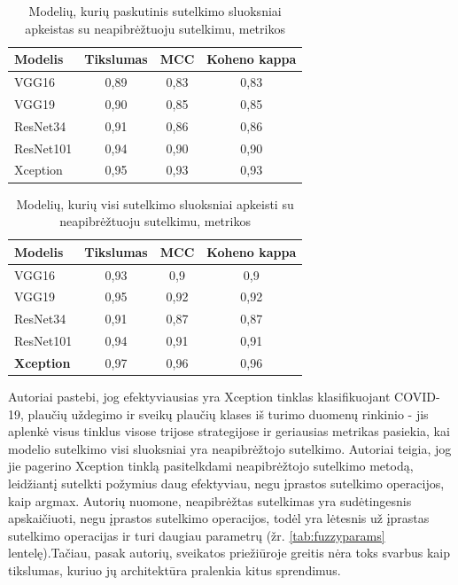 \documentclass[fleqn]{VUMIFKompMagistrinis}
\begin{document}
\begin{table}[H]\footnotesize
  \centering
\caption{Modelių, kurių paskutinis sutelkimo sluoksniai apkeistas su neapibrėžtuoju sutelkimu, metrikos \cite{HASAN2023}}
\begin{tabular}{|l|c|c|c|}
\hline
Modelis      & Tikslumas & MCC   & Koheno kappa \\ \hline
VGG16      & 0,89  & 0,83 &  0,83           \\
VGG19      & 0,90  & 0,85 &  0,85           \\
ResNet34   & 0,91  & 0,86 & 0,86           \\
ResNet101  & 0,94  & 0,90 & 0,90           \\
Xception   & 0,95  & 0,93 & 0,93         \\ \hline
  \end{tabular}
  \label{tab:fuzzyiverciai2}
\end{table}

\begin{table}[H]\footnotesize
  \centering
\caption{Modelių, kurių visi sutelkimo sluoksniai apkeisti su neapibrėžtuoju sutelkimu, metrikos \cite{HASAN2023}}
\begin{tabular}{|l|c|c|c|}
\hline
Modelis      & Tikslumas & MCC   & Koheno kappa \\ \hline
VGG16      & 0,93  & 0,9 &  0,9            \\
VGG19      & 0,95  & 0,92 &  0,92            \\
ResNet34   & 0,91  & 0,87 & 0,87            \\
ResNet101  & 0,94  & 0,91 & 0,91            \\
\textbf{Xception}   & 0,97  & 0,96 & 0,96          \\ \hline
  \end{tabular}
  \label{tab:fuzzyiverciai3}
\end{table}
\par
Autoriai pastebi, jog efektyviausias yra Xception tinklas klasifikuojant COVID-19, plaučių uždegimo ir sveikų plaučių klases iš turimo duomenų rinkinio - jis aplenkė visus tinklus visose trijose strategijose ir geriausias metrikas pasiekia, kai modelio sutelkimo visi sluoksniai yra neapibrėžtojo sutelkimo. Autoriai teigia, jog jie pagerino Xception tinklą pasitelkdami neapibrėžtojo sutelkimo metodą, leidžiantį sutelkti požymius daug efektyviau, negu įprastos sutelkimo operacijos, kaip argmax. Autorių nuomone, neapibrėžtas sutelkimas yra sudėtingesnis apskaičiuoti, negu įprastos sutelkimo operacijos, todėl yra lėtesnis už įprastas sutelkimo operacijas ir turi daugiau parametrų (žr. \ref{tab:fuzzyparams} lentelę).Tačiau, pasak autorių, sveikatos priežiūroje greitis nėra toks svarbus kaip tikslumas, kuriuo jų architektūra pralenkia kitus sprendimus. \cite{HASAN2023}
\end{document}
